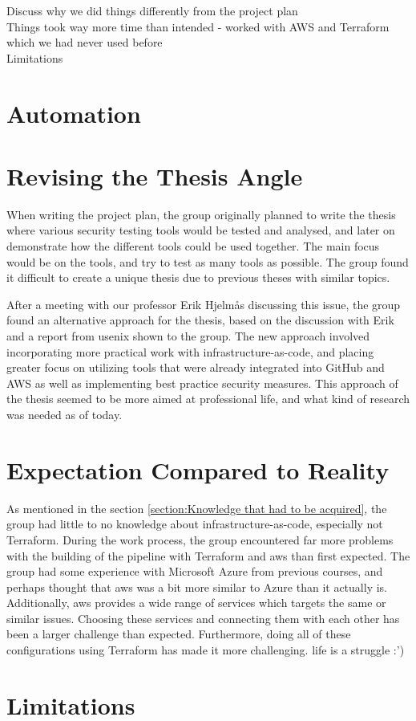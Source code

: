 Discuss why we did things differently from the project plan \\
Things took way more time than intended - worked with AWS and Terraform which we had never used before\\
Limitations\\




\section{Automation}

\section{Revising the Thesis Angle}
When writing the project plan, the group originally planned to write the thesis where various security testing tools would be tested and analysed, and later on demonstrate how the different tools could be used together. The main focus would be on the tools, and try to test as many tools as possible. The group found it difficult to create a unique thesis due to previous theses with similar topics. 

After a meeting with our professor Erik Hjelmås discussing this issue, the group found an alternative approach for the thesis, based on the discussion with Erik and a report from usenix \cite{usenixreport} shown to the group. The new approach involved incorporating more practical work with infrastructure-as-code, and placing greater focus on utilizing tools that were already integrated into GitHub and AWS as well as implementing best practice security measures. This approach of the thesis seemed to be more aimed at professional life, and what kind of research was needed as of today.  


\section{Expectation Compared to Reality}
As mentioned in the section \ref{section:Knowledge that had to be acquired}, the group had little to no knowledge about infrastructure-as-code, especially not Terraform. During the work process, the group encountered far more problems with the building of the pipeline with Terraform and \acrshort{aws} than first expected. The group had some experience with Microsoft Azure from previous courses, and perhaps thought that \acrshort{aws} was a bit more similar to Azure than it actually is. Additionally, \acrshort{aws} provides a wide range of services which targets the same or similar issues. Choosing these services and connecting them with each other has been a larger challenge than expected. Furthermore, doing all of these configurations using Terraform has made it more challenging. life is a struggle :') 



\section{Limitations}

